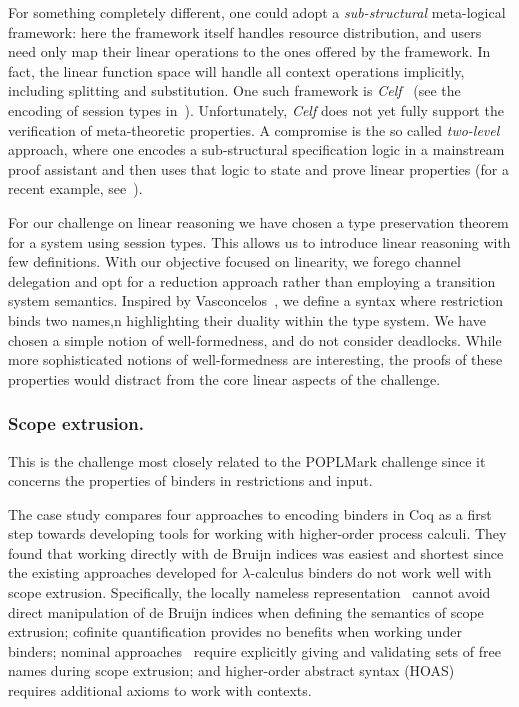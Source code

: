 \documentclass[runningheads]{llncs}
\begin{document}
For something completely different, one could adopt a \emph{sub-structural} meta-logical framework: here the framework itself handles resource distribution, and users need only map their linear operations to the ones offered by the framework.
In fact, the linear function space will handle all context operations implicitly, including splitting and substitution.
One such framework is \emph{Celf}~\cite{Schack-Nielsen:IJCAR08} (see the encoding of session types in~\cite{Bock2016}).
Unfortunately, \emph{Celf} does not yet fully support the verification of meta-theoretic properties.
A compromise is the so called \emph{two-level} approach, where one encodes a sub-structural specification logic in a mainstream proof assistant and then uses that logic to state and prove linear properties (for a recent example, see~\cite{Felty:MSCS21}).


For our challenge on linear reasoning we have chosen a type preservation theorem
for a system using session types.
This allows us to introduce linear reasoning with few definitions.
With our objective focused on linearity, we forego channel delegation
and opt for a reduction approach rather than employing a transition
system semantics.  Inspired by Vasconcelos~\cite{Vasconcelos2012}, we
define a syntax where restriction binds two names,n highlighting
their duality within the type system.  We have chosen a simple notion
of well-formedness, and do not  consider
deadlocks. While more sophisticated notions of well-formedness are
interesting, the proofs of these properties would distract from the
core linear aspects of the challenge.

\subsubsection{Scope extrusion.}
This is the challenge most closely related to the POPLMark challenge
since it concerns the properties of binders in restrictions and input.

The case study \cite{AmbalLS21} compares four approaches to encoding binders in Coq as a first step towards developing tools for working with higher-order process calculi.
They found that working directly with de Bruijn indices was easiest and shortest since the existing approaches developed for $\lambda$-calculus binders do not work well with scope extrusion.
Specifically, the locally nameless representation~\cite{Chargueraud2012} cannot avoid direct manipulation of de Bruijn indices when defining the semantics of scope extrusion; cofinite quantification provides no benefits when working under binders; nominal approaches~\cite{Pitts2003} require explicitly giving and validating sets of free names during scope extrusion; and higher-order abstract syntax (HOAS)~\cite{Pfenning1988} requires additional axioms to work with contexts.
\end{document}
